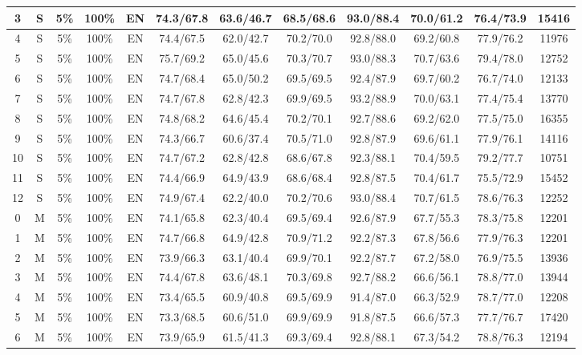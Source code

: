\begin{table*}
{\begin{tabular}{|c|c|c|c|c||c|c|c|c|c|c||c|}
3 & S & 5\% & 100\% & EN & 74.3/67.8 & 63.6/46.7 & 68.5/68.6 & 93.0/88.4 & 70.0/61.2 & 76.4/73.9 & 15416 \\ \hline
4 & S & 5\% & 100\% & EN & 74.4/67.5 & 62.0/42.7 & 70.2/70.0 & 92.8/88.0 & 69.2/60.8 & 77.9/76.2 & 11976 \\ \hline
5 & S & 5\% & 100\% & EN & 75.7/69.2 & 65.0/45.6 & 70.3/70.7 & 93.0/88.3 & 70.7/63.6 & 79.4/78.0 & 12752 \\ \hline
6 & S & 5\% & 100\% & EN & 74.7/68.4 & 65.0/50.2 & 69.5/69.5 & 92.4/87.9 & 69.7/60.2 & 76.7/74.0 & 12133 \\ \hline
7 & S & 5\% & 100\% & EN & 74.7/67.8 & 62.8/42.3 & 69.9/69.5 & 93.2/88.9 & 70.0/63.1 & 77.4/75.4 & 13770 \\ \hline
8 & S & 5\% & 100\% & EN & 74.8/68.2 & 64.6/45.4 & 70.2/70.1 & 92.7/88.6 & 69.2/62.0 & 77.5/75.0 & 16355 \\ \hline
9 & S & 5\% & 100\% & EN & 74.3/66.7 & 60.6/37.4 & 70.5/71.0 & 92.8/87.9 & 69.6/61.1 & 77.9/76.1 & 14116 \\ \hline
10 & S & 5\% & 100\% & EN & 74.7/67.2 & 62.8/42.8 & 68.6/67.8 & 92.3/88.1 & 70.4/59.5 & 79.2/77.7 & 10751 \\ \hline
11 & S & 5\% & 100\% & EN & 74.4/66.9 & 64.9/43.9 & 68.6/68.4 & 92.8/87.5 & 70.4/61.7 & 75.5/72.9 & 15452 \\ \hline
12 & S & 5\% & 100\% & EN & 74.9/67.4 & 62.2/40.0 & 70.2/70.6 & 93.0/88.4 & 70.7/61.5 & 78.6/76.3 & 12252 \\ \hline
0 & M & 5\% & 100\% & EN & 74.1/65.8 & 62.3/40.4 & 69.5/69.4 & 92.6/87.9 & 67.7/55.3 & 78.3/75.8 & 12201 \\ \hline
1 & M & 5\% & 100\% & EN & 74.7/66.8 & 64.9/42.8 & 70.9/71.2 & 92.2/87.3 & 67.8/56.6 & 77.9/76.3 & 12201 \\ \hline
2 & M & 5\% & 100\% & EN & 73.9/66.3 & 63.1/40.4 & 69.9/70.1 & 92.2/87.7 & 67.2/58.0 & 76.9/75.5 & 13936 \\ \hline
3 & M & 5\% & 100\% & EN & 74.4/67.8 & 63.6/48.1 & 70.3/69.8 & 92.7/88.2 & 66.6/56.1 & 78.8/77.0 & 13944 \\ \hline
4 & M & 5\% & 100\% & EN & 73.4/65.5 & 60.9/40.8 & 69.5/69.9 & 91.4/87.0 & 66.3/52.9 & 78.7/77.0 & 12208 \\ \hline
5 & M & 5\% & 100\% & EN & 73.3/68.5 & 60.6/51.0 & 69.9/69.9 & 91.8/87.5 & 66.6/57.3 & 77.7/76.7 & 17420 \\ \hline
6 & M & 5\% & 100\% & EN & 73.9/65.9 & 61.5/41.3 & 69.3/69.4 & 92.8/88.1 & 67.3/54.2 & 78.8/76.3 & 12194 \\ \hline

\end{tabular}}
\end{table*}
